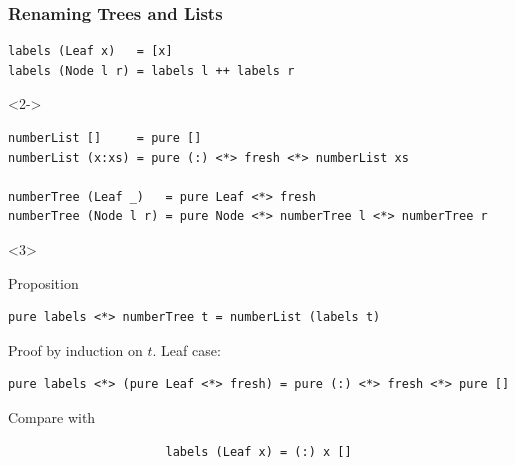 \documentclass[smaller,leqno]{beamer}
\begin{document}
\begin{frame}[fragile]
\frametitle{Renaming Trees and Lists}
%
%
%
\begin{lstlisting}
labels (Leaf x)   = [x]
labels (Node l r) = labels l ++ labels r
\end{lstlisting}

\begin{uncoverenv}<2->\begin{lstlisting}
numberList []     = pure []
numberList (x:xs) = pure (:) <*> fresh <*> numberList xs

numberTree (Leaf _)   = pure Leaf <*> fresh
numberTree (Node l r) = pure Node <*> numberTree l <*> numberTree r
\end{lstlisting}\end{uncoverenv}

\begin{uncoverenv}<3>
\begin{block}{Proposition}\begin{lstlisting}
pure labels <*> numberTree t = numberList (labels t)
\end{lstlisting}\end{block}

Proof by induction on $t$. Leaf case:
\begin{lstlisting}
pure labels <*> (pure Leaf <*> fresh) = pure (:) <*> fresh <*> pure []
\end{lstlisting}
Compare with
\begin{lstlisting}
                      labels (Leaf x) = (:) x []
\end{lstlisting}
\end{uncoverenv}
\end{frame}
\end{document}
